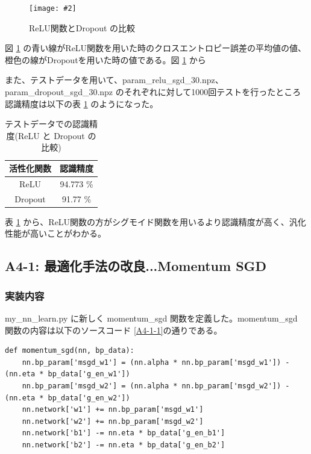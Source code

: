 \documentclass[a4paper,dvipdfmx]{jsarticle}
\newcommand{\image}[3]{
    \begin{figure}[H]
        \begin{center}
        \texttt{[image: \#2]}
        \end{center}
        \caption{#1}
        \label{#3}
    \end{figure}
}
\begin{document}
\image{ReLU関数とDropout の比較}{report_a2-1.png}{fig-A-2-1}

図 \ref{fig-A-2-1} の青い線がReLU関数を用いた時のクロスエントロピー誤差の平均値の値、橙色の線がDropoutを用いた時の値である。図 \ref{fig-A-2-1} から

また、テストデータを用いて、param\_relu\_sgd\_30.npz、param\_dropout\_sgd\_30.npz のそれぞれに対して1000回テストを行ったところ認識精度は以下の表 \ref{table-A1-1} のようになった。

\begin{table}[H]
\begin{center}
\caption{テストデータでの認識精度(ReLU と Dropout の比較)}
  \begin{tabular}{|c|c|} \hline
    活性化関数 & 認識精度  \\ \hline \hline
    ReLU & 94.773 \% \\ \hline
    Dropout & 91.77 \% \\ \hline
  \end{tabular}
	\label{table-A1-1}
\end{center}
\end{table}

表 \ref{table-A1-1} から、ReLU関数の方がシグモイド関数を用いるより認識精度が高く、汎化性能が高いことがわかる。

 
\subsection*{A4-1: 最適化手法の改良...Momentum SGD}

\subsubsection*{実装内容}
my\_nn\_learn.py に新しく momentum\_sgd 関数を定義した。momentum\_sgd 関数の内容は以下のソースコード \ref{A4-1-1}の通りである。
\begin{lstlisting}[caption="Momentum SGD",label=A4-1-1]
def momentum_sgd(nn, bp_data):
    nn.bp_param['msgd_w1'] = (nn.alpha * nn.bp_param['msgd_w1']) - (nn.eta * bp_data['g_en_w1'])
    nn.bp_param['msgd_w2'] = (nn.alpha * nn.bp_param['msgd_w2']) - (nn.eta * bp_data['g_en_w2'])
    nn.network['w1'] += nn.bp_param['msgd_w1']
    nn.network['w2'] += nn.bp_param['msgd_w2']
    nn.network['b1'] -= nn.eta * bp_data['g_en_b1']
    nn.network['b2'] -= nn.eta * bp_data['g_en_b2']
\end{lstlisting}
\end{document}
